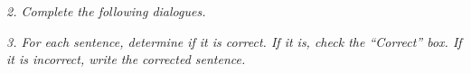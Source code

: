 \documentclass{exam}
\begin{document}
%
%
%
%
%
%
%
%
%
%
%
%
%
%
%
%
%
%
%
%

\noindent \textit{2. Complete the following dialogues.}

\begin{CJK*}{UTF8}{gbsn}
%
%
%
%
%
%
%
%
%
%
%
%
%
%
%
%
%
%
%
%
\end{CJK*}


 \noindent \textit{3. For each sentence, determine if it is correct. If it is, check the ``Correct'' box. If it is incorrect, write the corrected sentence.}

%
%
%
%
%
%
%
%
%
%
%
%
%
%
%
%
%
%
%
%
\end{document}
